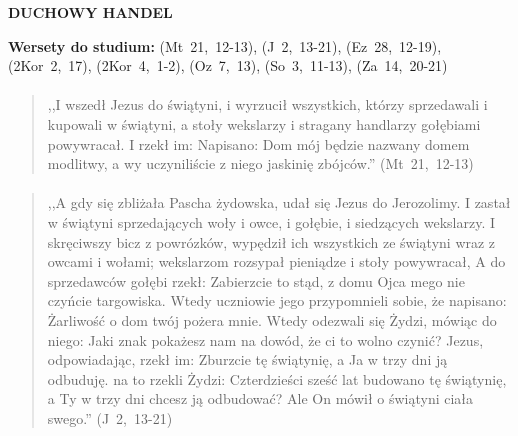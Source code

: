 \documentclass[10pt,a4paper,oneside]{article}
\begin{document}
\centerline{\textbf{\MakeUppercase{Duchowy handel}}}
\begin{center}
\textbf{Wersety do studium:} 
\mbox{(Mt 21, 12-13)}, \mbox{(J 2, 13-21)}, \mbox{(Ez 28, 12-19)}, \mbox{(2Kor 2, 17)}, \mbox{(2Kor 4, 1-2)}, \mbox{(Oz 7, 13)}, \mbox{(So 3, 11-13)}, \mbox{(Za 14, 20-21)}
\end{center}
\paragraph{}
\begin{quote}
,,I wszedł Jezus do świątyni, i wyrzucił wszystkich, którzy sprzedawali i kupowali w świątyni, a stoły wekslarzy i stragany handlarzy gołębiami powywracał. I rzekł im: Napisano: Dom mój będzie nazwany domem modlitwy, a wy uczyniliście z niego jaskinię zbójców.'' \mbox{(Mt 21, 12-13)}
\end{quote}
\paragraph{}
\begin{quote}
,,A gdy się zbliżała Pascha żydowska, udał się Jezus do Jerozolimy. I zastał w świątyni sprzedających woły i owce, i gołębie, i siedzących wekslarzy. I skręciwszy bicz z powrózków, wypędził ich wszystkich ze świątyni wraz z owcami i wołami; wekslarzom rozsypał pieniądze i stoły powywracał, A do sprzedawców gołębi rzekł: Zabierzcie to stąd, z domu Ojca mego nie czyńcie targowiska. Wtedy uczniowie jego przypomnieli sobie, że napisano: Żarliwość o dom twój pożera mnie. Wtedy odezwali się Żydzi, mówiąc do niego: Jaki znak pokażesz nam na dowód, że ci to wolno czynić? Jezus, odpowiadając, rzekł im: Zburzcie tę świątynię, a Ja w trzy dni ją odbuduję. na to rzekli Żydzi: Czterdzieści sześć lat budowano tę świątynię, a Ty w trzy dni chcesz ją odbudować? Ale On mówił o świątyni ciała swego.'' \mbox{(J 2, 13-21)}
\end{quote}
\end{document}
